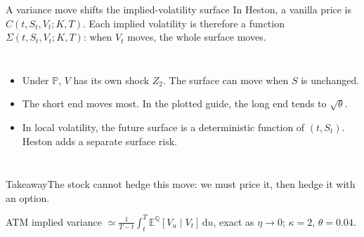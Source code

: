 \documentclass[handout,10pt,t,aspectratio=169]{beamer}
\newenvironment{keybox}{\begin{exampleblock}{Takeaway}}{\end{exampleblock}}
\newcommand{\E}{\mathbb E}
\newcommand{\Q}{\mathbb Q}
\newcommand{\Pp}{\mathbb P}
\newcommand{\dd}{\,\mathrm d}
\newcommand{\source}[1]{\vfill{\scriptsize\color{gray}#1\par}}
\begin{document}
\begin{frame}{A variance move shifts the implied-volatility surface}
\small
In Heston, a vanilla price is \(C(t,S_t,V_t;K,T)\). Each implied volatility is
therefore a function \(\Sigma(t,S_t,V_t;K,T)\): when \(V_t\) moves, the whole surface moves.
\begin{columns}[T,onlytextwidth]
\begin{itemize}
\item Under \(\Pp\), \(V\) has its own shock \(Z_2\). The surface can move
when \(S\) is unchanged.
\item The short end moves most. In the plotted guide, the long end tends to \(\sqrt\theta\).
\item In local volatility, the future surface is a deterministic function of
\((t,S_t)\). Heston adds a separate surface risk.
\end{itemize}
\end{columns}
\begin{keybox}The stock cannot hedge this move: we must price it, then hedge it with an option.\end{keybox}
\source{ATM implied variance \(\simeq\frac{1}{T-t}\int_t^T\E^\Q[V_u\mid V_t]\dd u\),
exact as \(\eta\to0\); \(\kappa=2\), \(\theta=0.04\).}
\end{frame}
\end{document}
